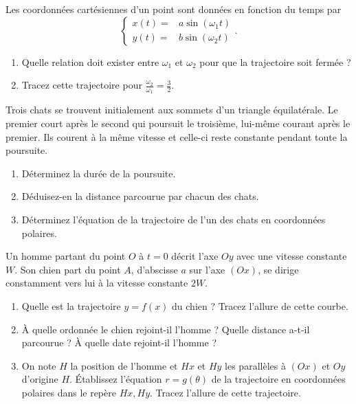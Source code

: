 %
\begin{exercice}
  Les coordonnées cartésiennes d'un point sont données en fonction du temps par
  \begin{equation}
    \begin{cases}
      x(t)=&a\sin(\omega_1 t)\\
      y(t)=&b\sin(\omega_2 t)
    \end{cases}.
  \end{equation}
  \begin{enumerate}
  \item Quelle relation doit exister entre $\omega_1$ et $\omega_2$ pour que la trajectoire soit fermée ?
  \item Tracez cette trajectoire pour $\frac{\omega_2}{\omega_1}=\frac{3}{2}$.
  \end{enumerate}
\end{exercice}
%
\begin{exercice}
  Trois chats se trouvent initialement aux sommets d'un triangle équilatérale. Le premier court après le second qui poursuit le troisième, lui-même courant après le premier. Ils courent à la même vitesse et celle-ci reste constante pendant toute la poursuite.
  \begin{enumerate}
  \item Déterminez la durée de la poursuite.
  \item Déduisez-en la distance parcourue par chacun des chats.
  \item Déterminez l'équation de la trajectoire de l'un des chats en coordonnées polaires.
  \end{enumerate}
\end{exercice}
%
\begin{exercice}
  Un homme partant du point $O$ à $t=0$ décrit l'axe $Oy$ avec une vitesse constante $W$. Son chien part du point $A$, d'abscisse $a$ sur l'axe $(Ox)$, se dirige constamment vers lui à la vitesse constante $2W$.
  \begin{enumerate}
  \item Quelle est la trajectoire $y=f(x)$ du chien ? Tracez l'allure de cette courbe.
  \item À quelle ordonnée le chien rejoint-il l'homme ? Quelle distance a-t-il parcourue ? À quelle date rejoint-il l'homme ?
  \item On note $H$ la position de l'homme et $Hx$ et $Hy$ les parallèles à $(Ox)$ et $Oy$ d'origine $H$. Établissez l'équation $r=g(\theta)$ de la trajectoire en coordonnées polaires dans le repère $Hx,Hy$. Tracez l'allure de cette trajectoire.
  \end{enumerate}
\end{exercice}